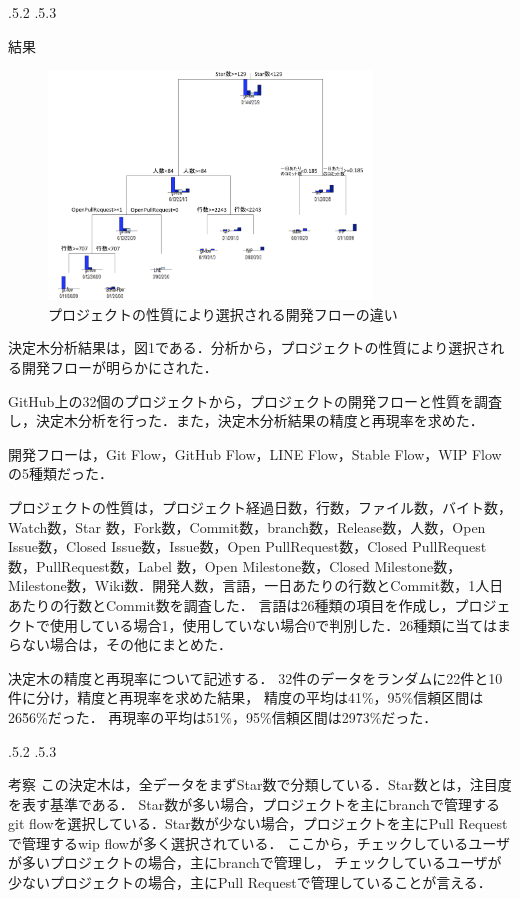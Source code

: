 \documentclass[uplatex,twocolumn]{jsarticle}
\makeatletter
\renewcommand{\section}{%
    \if@slide\clearpage\fi
    \@startsection{section}{1}{\z@}%
    {\Cvs \@plus.5\Cdp \@minus.2\Cdp}%
    {.5\Cvs \@plus.3\Cdp}%
    {\normalfont\raggedright}}
\makeatother
\begin{document}
\section{結果}

\begin{figure}[H]
\includegraphics[width=8.6cm,clip]{decisiontree.png}
\caption{プロジェクトの性質により選択される開発フローの違い}\label{決定木}
\end{figure}

決定木分析結果は，図1である．分析から，プロジェクトの性質により選択される開発フローが明らかにされた．


GitHub上の32個のプロジェクトから，プロジェクトの開発フローと性質を調査し，決定木分析を行った．また，決定木分析結果の精度と再現率を求めた．

開発フローは，Git Flow，GitHub Flow，LINE Flow，Stable Flow，WIP Flowの5種類だった．

プロジェクトの性質は，プロジェクト経過日数，行数，ファイル数，バイト数，Watch数，Star 数，Fork数，Commit数，branch数，Release数，人数，Open Issue数，Closed Issue数，Issue数，Open PullRequest数，Closed PullRequest数，PullRequest数，Label 数，Open Milestone数，Closed Milestone数，Milestone数，Wiki数．開発人数，言語，一日あたりの行数とCommit数，1人日あたりの行数とCommit数を調査した．
言語は26種類の項目を作成し，プロジェクトで使用している場合1，使用していない場合0で判別した．26種類に当てはまらない場合は，その他にまとめた．


决定木の精度と再現率について記述する．
32件のデータをランダムに22件と10件に分け，精度と再現率を求めた結果，
精度の平均は41\%，95\%信頼区間は26\~56\%だった．
再現率の平均は51\%，95\%信頼区間は29\~73\%だった．


\section{考察}
この決定木は，全データをまずStar数で分類している．Star数とは，注目度を表す基準である．
Star数が多い場合，プロジェクトを主にbranchで管理するgit flowを選択している．Star数が少ない場合，プロジェクトを主にPull Requestで管理するwip flowが多く選択されている．
ここから，チェックしているユーザが多いプロジェクトの場合，主にbranchで管理し，
チェックしているユーザが少ないプロジェクトの場合，主にPull Requestで管理していることが言える．
\end{document}

